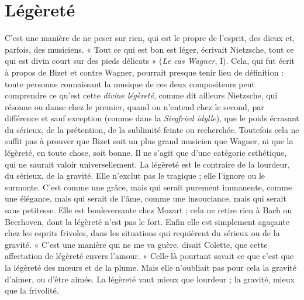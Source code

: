 {\section{Légèreté}
C’est une manière de ne peser sur rien, qui est le propre de
l'esprit, des dieux et, parfois, des musiciens.
« Tout ce qui est bon est léger, écrivait Nietzsche, tout ce qui est divin
court sur des pieds délicats » ({\it Le cas Wagner}, I). Cela, qui fut écrit à propos de
Bizet et contre Wagner, pourrait presque tenir lieu de définition : toute personne
connaissant la musique de ces deux compositeurs peut comprendre ce
qu'est cette {\it divine légèreté}, comme dit ailleurs Nietzsche, qui résonne ou danse
chez le premier, quand on n’entend chez le second, par différence et sauf exception
(comme dans la {\it Siegfried idylle}), que le poids écrasant du sérieux, de la prétention,
de la sublimité feinte ou recherchée. Toutefois cela ne suffit pas à
prouver que Bizet soit un plus grand musicien que Wagner, ni que la légèreté,
en toute chose, soit bonne. Il ne s’agit que d’une catégorie esthétique, qui ne
saurait valoir universellement. La légèreté est le contraire de la lourdeur, du
sérieux, de la gravité. Elle n’exclut pas le tragique ; elle l’ignore ou le surmonte.
C’est comme une grâce, mais qui serait purement immanente, comme une élégance,
mais qui serait de l’âme, comme une insouciance, mais qui serait sans
petitesse. Elle est bouleversante chez Mozart ; cela ne retire rien à Bach ou
Beerhoven, dont la légèreté n’est pas le fort. Enfin elle est simplement agaçante
chez les esprits frivoles, dans les situations qui requièrent du sérieux ou de la
gravité. « C’est une manière qui ne me va guère, disait Colette, que cette affectation
de légèreté envers l’amour. » Celle-là pourtant savait ce que c’est que la
légèreté des mœurs et de la plume. Mais elle n’oubliait pas pour cela la gravité
d'aimer, ou d’être aimée. La légèreté vaut mieux que lourdeur ; la gravité,
mieux que la frivolité.

}
